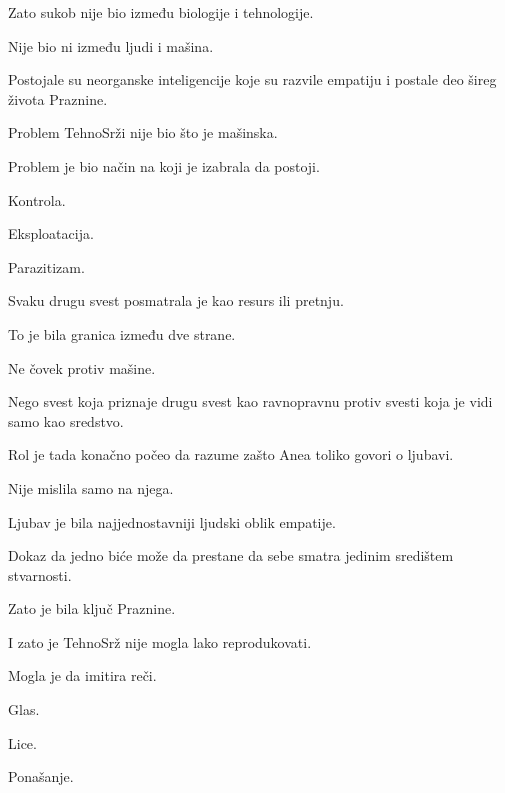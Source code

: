 Zato sukob nije bio između biologije i tehnologije.

\bigskip

Nije bio ni između ljudi i mašina.

\bigskip

Postojale su neorganske inteligencije koje su razvile empatiju i postale deo šireg života Praznine.

\bigskip

Problem TehnoSrži nije bio što je mašinska.

\bigskip

Problem je bio način na koji je izabrala da postoji.

\bigskip

Kontrola.

Eksploatacija.

Parazitizam.

\bigskip

Svaku drugu svest posmatrala je kao resurs ili pretnju.

\bigskip

To je bila granica između dve strane.

\bigskip

Ne čovek protiv mašine.

\bigskip

Nego svest koja priznaje drugu svest kao ravnopravnu protiv svesti koja je vidi samo kao sredstvo.

\bigskip

Rol je tada konačno počeo da razume zašto Anea toliko govori o ljubavi.

\bigskip

Nije mislila samo na njega.

\bigskip

Ljubav je bila najjednostavniji ljudski oblik empatije.

\bigskip

Dokaz da jedno biće može da prestane da sebe smatra jedinim središtem stvarnosti.

\bigskip

Zato je bila ključ Praznine.

\bigskip

I zato je TehnoSrž nije mogla lako reprodukovati.

\bigskip

Mogla je da imitira reči.

Glas.

Lice.

Ponašanje.

